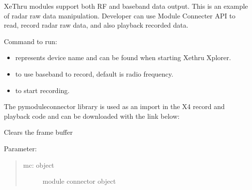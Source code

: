\documentclass[letterpaper,10pt,english]{sphinxmanual}
\begin{document}
XeThru modules support both RF and baseband data output. This is an example of radar raw data manipulation.
Developer can use Module Connecter API to read, record radar raw data, and also playback recorded data.

Command to run: 
\begin{itemize}
\item {} 
 represents device name and can be found when starting Xethru Xplorer.

\item {} 
 to use baseband to record, default is radio frequency.

\item {} 
 to start recording.

\end{itemize}

The pymoduleconnector library is used as an import in the X4 record and playback code and can be downloaded with the link below:


\label{\detokenize{X4 radar:module-X4_record_playback}}

\begin{fulllineitems}
\label{\detokenize{X4 radar:X4_record_playback.clear_buffer}}
Clears the frame buffer

Parameter:
\begin{quote}
\begin{description}
\item[{mc: object}] \leavevmode
module connector object

\end{description}
\end{quote}

\end{fulllineitems}

\end{document}
